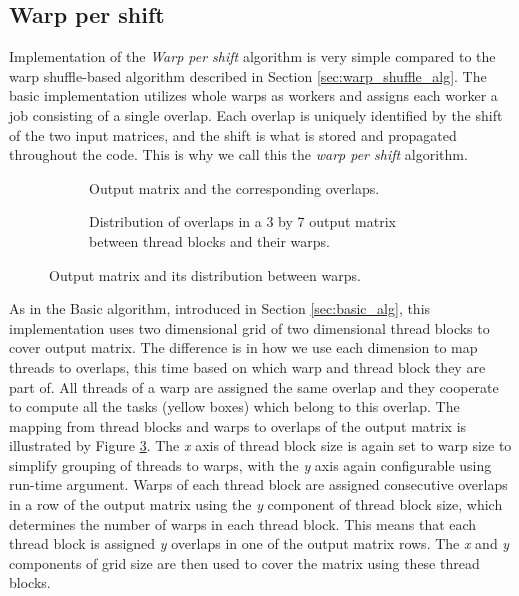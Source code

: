 \subsection{Warp per shift}

Implementation of the \textit{Warp per shift} algorithm is very simple compared to the warp shuffle-based algorithm described in Section \ref{sec:warp_shuffle_alg}. The basic implementation utilizes whole warps as workers and assigns each worker a job consisting of a single overlap. Each overlap is uniquely identified by the shift of the two input matrices, and the shift is what is stored and propagated throughout the code. This is why we call this the \textit{warp per shift} algorithm.

\begin{figure}[ht]
	\centering	
	\begin{subfigure}{0.55\textwidth}
		\fontsize{6}{8}\selectfont
		\centering
		\def\svgwidth{\textwidth}
		
		\caption{Output matrix and the corresponding overlaps.}
		\label{fig:warp_per_shift_overlaps}
	\end{subfigure}
	\hfill
	\begin{subfigure}{0.4\textwidth}
		\centering
		\def\svgwidth{\textwidth}
		\fontsize{6}{8}\selectfont
		
		\caption{Distribution of overlaps in a 3 by 7 output matrix between thread blocks and their warps.}
		\label{fig:warp_per_shift_warps}
	\end{subfigure}
	
	\caption{Output matrix and its distribution between warps.}
\end{figure}

As in the Basic algorithm, introduced in Section \ref{sec:basic_alg}, this implementation uses two dimensional grid of two dimensional thread blocks to cover output matrix. The difference is in how we use each dimension to map threads to overlaps, this time based on which warp and thread block they are part of. All threads of a warp are assigned the same overlap and they cooperate to compute all the tasks (yellow boxes) which belong to this overlap. The mapping from thread blocks and warps to overlaps of the output matrix is illustrated by Figure \ref{fig:warp_per_shift_warps}. The \textit{x} axis of thread block size is again set to warp size to simplify grouping of threads to warps, with the \textit{y} axis again configurable using run-time argument. Warps of each thread block are assigned consecutive overlaps in a row of the output matrix using the \textit{y} component of thread block size, which determines the number of warps in each thread block. This means that each thread block is assigned \textit{y} overlaps in one of the output matrix rows.
The \textit{x} and \textit{y} components of grid size are then used to cover the matrix using these thread blocks.


